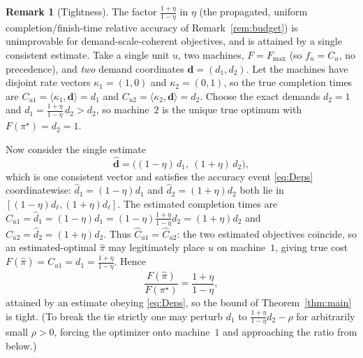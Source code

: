 \documentclass{amsart}
\theoremstyle{definition}
\newtheorem{remark}{Remark}
\begin{document}
\begin{remark}[Tightness]\label{rem:tight}
The factor $\frac{1+\eta}{1-\eta}$ in $\eta$ (the propagated, uniform
completion/finish-time relative accuracy of Remark~\ref{rem:budget}) is
unimprovable for demand-scale-coherent objectives, and is attained by a single
consistent estimate. Take a single unit $u$, two machines, $F=F_{\max}$ (so $f_u=C_u$, no
precedence), and \emph{two} demand coordinates $\mathbf d=(d_1,d_2)$. Let the
machines have disjoint rate vectors $\kappa_1=(1,0)$ and $\kappa_2=(0,1)$, so the
true completion times are $C_{u1}=\langle\kappa_1,\mathbf d\rangle=d_1$ and
$C_{u2}=\langle\kappa_2,\mathbf d\rangle=d_2$. Choose the exact demands
$d_2=1$ and $d_1=\frac{1+\eta}{1-\eta}\,d_2>d_2$, so machine~$2$ is
the unique true optimum with $F(\pi^\star)=d_2=1$.

Now consider the single estimate
\[
\widehat{\mathbf d}=\big((1-\eta)\,d_1,\ (1+\eta)\,d_2\big),
\]
which is one consistent vector and satisfies the accuracy event \eqref{eq:Deps}
coordinatewise: $\widehat d_1=(1-\eta)d_1$ and
$\widehat d_2=(1+\eta)d_2$ both lie in $[(1-\eta)d_\ell,
(1+\eta)d_\ell]$. The estimated completion times are
$\widehat C_{u1}=\widehat d_1=(1-\eta)d_1
=(1-\eta)\frac{1+\eta}{1-\eta}d_2=(1+\eta)d_2$ and
$\widehat C_{u2}=\widehat d_2=(1+\eta)d_2$. Thus
$\widehat C_{u1}=\widehat C_{u2}$: the two estimated objectives coincide, so an
estimated-optimal $\hat\pi$ may legitimately place $u$ on machine~$1$, giving
true cost $F(\hat\pi)=C_{u1}=d_1=\frac{1+\eta}{1-\eta}$. Hence
\[
\frac{F(\hat\pi)}{F(\pi^\star)}=\frac{1+\eta}{1-\eta},
\]
attained by an estimate obeying \eqref{eq:Deps}, so the bound of
Theorem~\ref{thm:main} is tight. (To break the tie strictly one may perturb
$d_1$ to $\frac{1+\eta}{1-\eta}d_2-\rho$ for arbitrarily small
$\rho>0$, forcing the optimizer onto machine~$1$ and approaching the ratio from
below.)
\end{remark}
\end{document}
